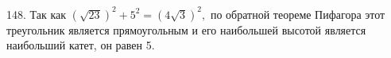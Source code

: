 148. Так как $(\sqrt{23})^2+5^2=(4\sqrt{3})^2,$ по обратной теореме Пифагора этот треугольник является прямоугольным и его наибольшей высотой является наибольший катет, он равен 5.\newpage\noindent
